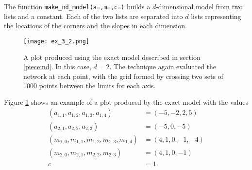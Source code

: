 \documentclass{somasmsc}
\begin{document}
\begin{exa}
The function \verb|make_nd_model(a=,m=,c=)| builds a $d$-dimensional model from two lists and a constant. Each of the two lists are separated into $d$ lists representing the locations of the corners and the slopes in each dimension.

\begin{figure}[H]\label{piece:ex_3_2}
\begin{center}
\texttt{[image: ex\_3\_2.png]}
\end{center}
\caption{A plot produced using the exact model described in section \ref{piece:nd}. In this case, $d=2$. The technique again evaluated the network at each point, with the grid formed by crossing two sets of 1000 points between the limits for each axis.}
\end{figure}

Figure \ref{piece:ex_3_2} shows an example of a plot produced by the exact model with the values
\begin{align*}
    \left(a_{1,1}, a_{1,2}, a_{1,3}, a_{1,4}\right) &= \left(-5, -2, 2, 5\right) \\
    \left(a_{2,1}, a_{2,2}, a_{2,3}\right) &= \left(-5, 0, -5\right) \\
    \left(m_{1,0}, m_{1,1}, m_{1,2}, m_{1,3}, m_{1,4}\right) &= \left(4, 1, 0, -1, -4\right) \\
    \left(m_{2,0}, m_{2,1}, m_{2,2}, m_{2,3}\right) &= \left(4, 1, 0, -1\right) \\
    c &= 1.
\end{align*}
\end{exa}
\end{document}
